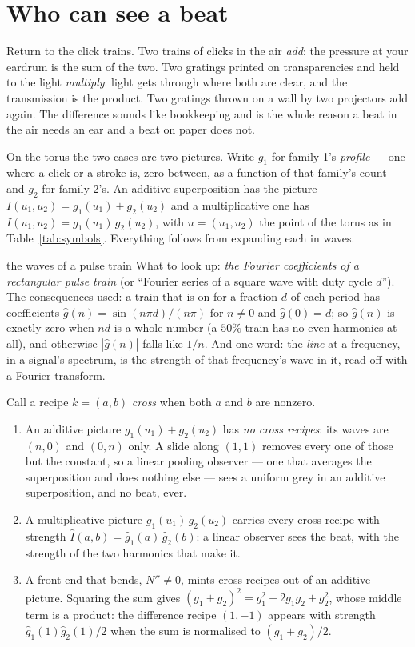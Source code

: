 \section{Who can see a beat}
\label{sec:whosees}

Return to the click trains. Two trains of clicks in the air \emph{add}: the
pressure at your eardrum is the sum of the two. Two gratings printed on
transparencies and held to the light \emph{multiply}: light gets through
where both are clear, and the transmission is the product. Two gratings
thrown on a wall by two projectors add again. The difference sounds like
bookkeeping and is the whole reason a beat in the air needs an ear and a
beat on paper does not.

On the torus the two cases are two pictures. Write $g_1$ for family 1's
\emph{profile} --- one where a click or a stroke is, zero between, as a
function of that family's count --- and $g_2$ for family 2's. An additive
superposition has the picture $I(u_1,u_2)=g_1(u_1)+g_2(u_2)$ and a
multiplicative one has $I(u_1,u_2)=g_1(u_1)\,g_2(u_2)$, with $u=(u_1,u_2)$
the point of the torus as in Table~\ref{tab:symbols}. Everything follows
from expanding each in waves.

\begin{lookup}{the waves of a pulse train}
What to look up: \emph{the Fourier coefficients of a rectangular pulse
train} (or ``Fourier series of a square wave with duty cycle $d$''). The
consequences used: a train that is on for a fraction $d$ of each period has
coefficients $\hat g(n)=\sin(n\pi d)/(n\pi)$ for $n\ne0$ and $\hat g(0)=d$;
so $\hat g(n)$ is exactly zero when $nd$ is a whole number (a $50\%$ train
has no even harmonics at all), and otherwise $|\hat g(n)|$ falls like
$1/n$. And one word: the \emph{line} at a frequency, in a signal's
spectrum, is the strength of that frequency's wave in it, read off with a
Fourier transform.
\end{lookup}

\begin{theorem}
\label{thm:whosees}
Call a recipe $k=(a,b)$ \emph{cross} when both $a$ and $b$ are nonzero.
\begin{enumerate}
\item An additive picture $g_1(u_1)+g_2(u_2)$ has \emph{no cross recipes}:
its waves are $(n,0)$ and $(0,n)$ only. A slide along $(1,1)$ removes every
one of those but the constant, so a linear pooling observer --- one that
averages the superposition and does nothing else --- sees a uniform grey
in an additive superposition, and no beat, ever.
\item A multiplicative picture $g_1(u_1)\,g_2(u_2)$ carries every cross
recipe with strength $\hat I(a,b)=\hat g_1(a)\,\hat g_2(b)$: a linear
observer sees the beat, with the strength of the two harmonics that make it.
\item A front end that bends, $N''\ne0$, mints cross recipes out of an
additive picture. Squaring the sum gives
$(g_1+g_2)^2=g_1^2+2g_1g_2+g_2^2$, whose middle term is a product: the
difference recipe $(1,-1)$ appears with strength $\hat g_1(1)\hat g_2(1)/2$
when the sum is normalised to $(g_1+g_2)/2$.
\end{enumerate}
\end{theorem}

